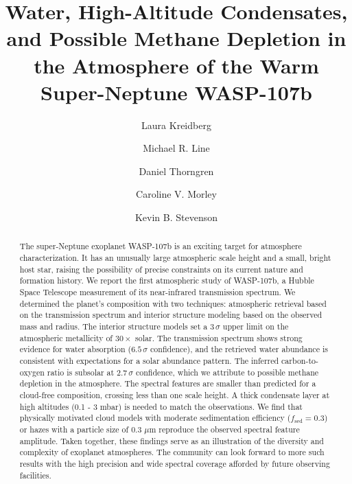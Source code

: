\documentclass[twocolumn, trackchanges]{aastex61}
\begin{document}
\title{Water, High-Altitude Condensates, and Possible Methane Depletion in the Atmosphere of the Warm Super-Neptune WASP-107\lowercase{b}}


\author{Laura Kreidberg}

\author{Michael R. Line}

\author{Daniel Thorngren}

\author{Caroline V. Morley}


\author{Kevin B. Stevenson}

\begin{abstract}
	The super-Neptune exoplanet WASP-107b is an exciting target for atmosphere characterization. It has an unusually large atmospheric scale height and a small, bright host star, raising the possibility of precise constraints on its current nature and formation history.  We report the first atmospheric study of WASP-107b, a Hubble Space Telescope measurement of its near-infrared transmission spectrum.  We determined the planet's composition with two techniques: atmospheric retrieval based on the transmission spectrum and interior structure modeling based on the observed mass and radius. The interior structure models set a $3\,\sigma$ upper limit on the atmospheric metallicity of $30\times$ solar. The transmission spectrum shows strong evidence for water absorption ($6.5\,\sigma$ confidence), and the retrieved water abundance is consistent with expectations for a solar abundance pattern. The inferred carbon-to-oxygen ratio is subsolar at $2.7\,\sigma$ confidence, which we attribute to possible methane depletion in the atmosphere.  The spectral features are smaller than predicted for a cloud-free composition, crossing less than one scale height. A thick condensate layer at high altitudes (0.1 - 3 mbar) is needed to match the observations. We find that physically motivated cloud models with moderate sedimentation efficiency ($f_\mathrm{sed} = 0.3$) or hazes with a particle size of 0.3 $\mu$m reproduce the observed spectral feature amplitude. Taken together, these findings serve as an illustration of the diversity and complexity of exoplanet atmospheres. The community can look forward to more such results with the high precision and wide spectral coverage afforded by future observing facilities. 
\end{abstract}
\end{document}
